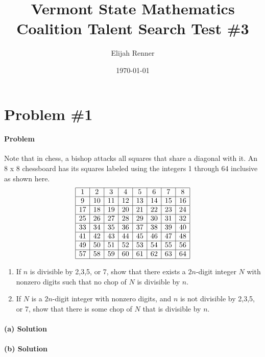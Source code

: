 \documentclass[10pt]{article}
\title{Vermont State Mathematics Coalition Talent Search Test \#3}
\author{Elijah Renner}
\date{\today}
\theoremstyle{plain}
\theoremstyle{definition}
\theoremstyle{remark}
\begin{document}
\maketitle
\tableofcontents

\section{Problem \#1} 

\paragraph{Problem} Note that in chess, a bishop attacks all squares that share a diagonal with it. An 8 x 8
chessboard has its squares labeled using the integers 1 through 64 inclusive as shown here.
\[
\begin{array}{|c|c|c|c|c|c|c|c|}
\hline
1 & 2 & 3 & 4 & 5 & 6 & 7 & 8 \\ \hline
9 & 10 & 11 & 12 & 13 & 14 & 15 & 16 \\ \hline
17 & 18 & 19 & 20 & 21 & 22 & 23 & 24 \\ \hline
25 & 26 & 27 & 28 & 29 & 30 & 31 & 32 \\ \hline
33 & 34 & 35 & 36 & 37 & 38 & 39 & 40 \\ \hline
41 & 42 & 43 & 44 & 45 & 46 & 47 & 48 \\ \hline
49 & 50 & 51 & 52 & 53 & 54 & 55 & 56 \\ \hline
57 & 58 & 59 & 60 & 61 & 62 & 63 & 64 \\ \hline
\end{array}
\]

\begin{enumerate}[label=(\alph*)]
	\item If \(n\) is divisible by 2,3,5, or 7, show that there exists a \(2n\)-digit integer \(N\) with nonzero digits such that no chop of \(N\) is divisible by \(n\).
	\item If \(N\) is a \(2n\)-digit integer with nonzero digits, and \(n\) is not divisible by 2,3,5, or 7, show that there is some chop of \(N\) that is divisible by \(n\).
\end{enumerate}

\paragraph{(a) Solution}

\paragraph{(b) Solution}
\end{document}
